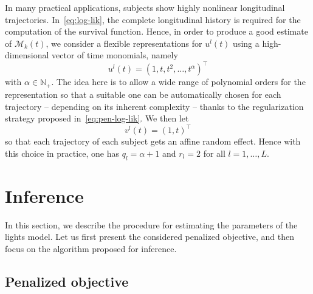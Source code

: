\documentclass[11pt]{article}
\newcommand{\cM}{\mathcal M}
\newcommand{\N}{\mathds N}
\begin{document}
In many practical applications, subjects show highly nonlinear longitudinal trajectories. In~\eqref{eq:log-lik}, the complete longitudinal history is required for the computation of the survival function. Hence, in order to produce a good estimate of $\cM_k(t)$, we consider a flexible representations for $u^l(t)$ using a high-dimensional vector of time monomials, namely 
\[u^l(t) = (1, t, t^2, \ldots, t^\alpha)^\top\]
with $\alpha \in \N_+$.
The idea here is to allow a wide range of polynomial orders for the representation so that a suitable one can be automatically chosen for each trajectory -- depending on its inherent complexity -- thanks to the regularization strategy proposed in~\eqref{eq:pen-log-lik}.
We then let \[v^l(t) = (1, t)^\top\] so that each trajectory of each subject gets an affine random effect. Hence with this choice in practice, one has $q_l=\alpha + 1$ and $r_l=2$ for all $l=1, \ldots, L$.

\section{Inference}
\label{sec:inference}

In this section, we describe the procedure for estimating the parameters of the lights model. Let us first present the considered penalized objective, and then focus on the algorithm proposed for inference.

\subsection{Penalized objective}
\label{sec:penalized-obj}
\end{document}

